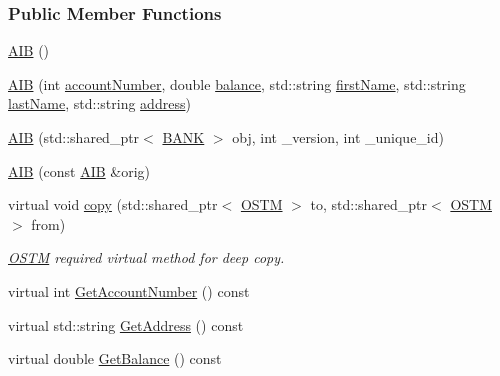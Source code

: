 \subsubsection*{Public Member Functions}
\begin{DoxyCompactItemize}
\item 
\hyperlink{class_a_i_b_a4783110463bf12f937a85b62455faf38_a4783110463bf12f937a85b62455faf38}{A\+IB} ()
\item 
\hyperlink{class_a_i_b_a5fe3963becf294f6b1ce1a747f9122a0_a5fe3963becf294f6b1ce1a747f9122a0}{A\+IB} (int \hyperlink{class_a_i_b_aafc08efeec5b8c800c32ee32f20603a7_aafc08efeec5b8c800c32ee32f20603a7}{account\+Number}, double \hyperlink{class_a_i_b_a3c8d637bd997c1f062d844a88e2559ba_a3c8d637bd997c1f062d844a88e2559ba}{balance}, std\+::string \hyperlink{class_a_i_b_a869f72057cb63ebf0cfd257069e15c7c_a869f72057cb63ebf0cfd257069e15c7c}{first\+Name}, std\+::string \hyperlink{class_a_i_b_ace7b8b648d1b44b7ee2f4be002952b7a_ace7b8b648d1b44b7ee2f4be002952b7a}{last\+Name}, std\+::string \hyperlink{class_a_i_b_ae6a67cc33d1e5fa83a52a238e45ca3dc_ae6a67cc33d1e5fa83a52a238e45ca3dc}{address})
\item 
\hyperlink{class_a_i_b_aa0faccb7aadf423d12bddb2469ff5053_aa0faccb7aadf423d12bddb2469ff5053}{A\+IB} (std\+::shared\+\_\+ptr$<$ \hyperlink{class_b_a_n_k}{B\+A\+NK} $>$ obj, int \+\_\+version, int \+\_\+unique\+\_\+id)
\item 
\hyperlink{class_a_i_b_ab13d0db3498d59dbe6a946c469587c55_ab13d0db3498d59dbe6a946c469587c55}{A\+IB} (const \hyperlink{class_a_i_b}{A\+IB} \&orig)
\item 
virtual void \hyperlink{class_a_i_b_ad76f25ce86cb42028440f41c371903e0_ad76f25ce86cb42028440f41c371903e0}{copy} (std\+::shared\+\_\+ptr$<$ \hyperlink{class_o_s_t_m}{O\+S\+TM} $>$ to, std\+::shared\+\_\+ptr$<$ \hyperlink{class_o_s_t_m}{O\+S\+TM} $>$ from)
\begin{DoxyCompactList}\small\item\em \hyperlink{class_o_s_t_m}{O\+S\+TM} required virtual method for deep copy. \end{DoxyCompactList}\item 
virtual int \hyperlink{class_a_i_b_aef34bfbf20d767114e05b8b532cab777_aef34bfbf20d767114e05b8b532cab777}{Get\+Account\+Number} () const 
\item 
virtual std\+::string \hyperlink{class_a_i_b_a5092c8741fbe231531aa5aaa61d26b9c_a5092c8741fbe231531aa5aaa61d26b9c}{Get\+Address} () const 
\item 
virtual double \hyperlink{class_a_i_b_ac75087ae73c308bd946e47a71dc85b86_ac75087ae73c308bd946e47a71dc85b86}{Get\+Balance} () const 

\end{DoxyCompactItemize}
